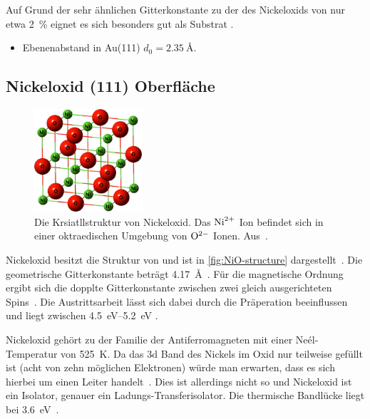             Auf Grund der sehr ähnlichen Gitterkonstante zu der des Nickeloxids von nur etwa \SI{2}{\percent} eignet es sich besonders gut als Substrat \cite{NiO_36}.
            \begin{itemize}
                \item Ebenenabstand in Au(111) $d_0 = \SI{2.35}{\angstrom}$.\textbf{\cite{5A_1}}
            \end{itemize} 

        \subsection{Nickeloxid (111) Oberfläche}
            \begin{figure}
                \centering
                \includegraphics[width=4cm]{./content/pictures/NiO/NiO-structure.jpg}
                \caption{Die Krsiatllstruktur von Nickeloxid. Das $\ce{Ni}^{2+}$ Ion befindet sich in einer oktraedischen Umgebung von $\ce{O}^{2-}$ Ionen. Aus~\cite{NiO-structure}.}
                \label{fig:NiO-structure}
            \end{figure}
            Nickeloxid besitzt die Struktur von  und ist in \autoref{fig:NiO-structure} dargestellt~\cite{kunz_chemisorption_1985}. 
            Die geometrische Gitterkonstante beträgt \SI{4.17}{\angstrom}~\cite{sebbari_uranyl_2012}.
            Für die magnetische Ordnung ergibt sich die dopplte Gitterkonstante zwischen zwei gleich ausgerichteten Spins~\cite{Suter}.
            Die Austrittsarbeit lässt sich dabei durch die Präperation beeinflussen und liegt zwischen \SIrange[range-phrase=' und ']{4.5}{5.2}{\electronvolt} \cite{poulain_electronic_2020}.

            Nickeloxid gehört zu der Familie der Antiferromagneten mit einer Neél-Temperatur von \SI{525}{\kelvin}.
            Da das 3d Band des Nickels im Oxid nur teilweise gefüllt ist (acht von zehn möglichen Elektronen) würde man erwarten, dass es sich hierbei um einen Leiter handelt~\cite{kunz_chemisorption_1985}.
            Dies ist allerdings nicht so und Nickeloxid ist ein Isolator, genauer ein Ladungs-Transferisolator.
            Die thermische Bandlücke liegt bei \SI{3.6}{\electronvolt}~\cite{kunz_chemisorption_1985}.

